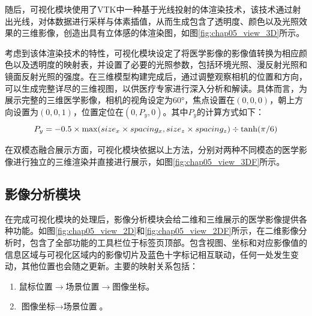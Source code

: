 随后，可视化模块使用了VTK中一种基于光线投射的体渲染技术，该技术通过射出光线，对体数据进行采样与体素插值，从而生成包含了透明度、颜色以及光照效果的三维影像，创造出具有立体感的体渲染图，如图\ref{fig:chap05_view_3D}所示。

考虑到该体渲染技术的特性，可视化模块设定了将医学影像的影像值转换为相应颜色以及透明度的映射表，并设置了必要的光照参数，包括环境光照、漫反射光照和镜面反射光照的强度。在三维模型构建完成后，通过调整观察相机的位置和方向，可以生成完整详尽的三维视图，以供医疗专家进行深入分析和解读。具体而言，为展示完整的三维医学影像，相机的视角设定为60°，焦点设置在\((0,0,0)\)，朝上方向设置为\((0,0,1)\)，位置定位在\((0,P_y,0)\)。其中\(P_y\)的计算方式如下：
\begin{equation}
    P_y = -0.5 \times \max(size_x \times spacing_x, size_z \times spacing_z) \div \tanh(\pi / 6)\\
\end{equation}

在双模态融合展示方面，可视化模块依据以上方法，分别对两种不同模态的医学影像进行独立的三维渲染并直接进行展示，如图\ref{fig:chap05_view_3DF}所示。

\subsection{影像分析模块}

在完成可视化模块的处理后，影像分析模块会给二维和三维展示的医学影像提供各种功能。如图\ref{fig:chap05_view_2D}和\ref{fig:chap05_view_2DF}所示，在二维影像分析时，包含了全部功能的工具栏位于标签页顶部。包含视图、坐标和对应影像值的信息区域与可视化区域内的影像切片及蓝色十字标记相互联动，任何一处发生变动，其他位置也会随之更新。主要的映射关系包括：
\begin{enumerate}
    \item \(\text{鼠标位置} \rightarrow \text{场景位置} \rightarrow \text{图像坐标}\)\label{en:chap05_1}。
    \item \(\text{图像坐标} \rightarrow \text{场景位置}\)\label{en:chap05_2}。
\end{enumerate}

